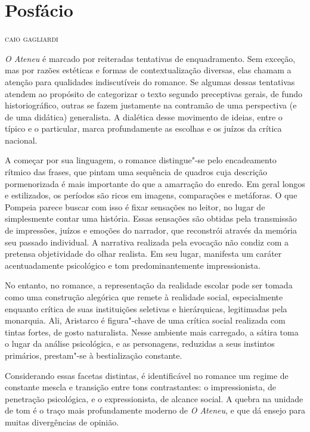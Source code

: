 \chapter[Posfácio]{Posfácio }


\begin{flushright}
\textsc{caio gagliardi}
\end{flushright}

\textit{O Ateneu} é marcado por reiteradas
tentativas de enquadramento. Sem exceção, mas por razões estéticas e
formas de contextualização diversas, elas chamam a atenção para
qualidades indiscutíveis do romance. Se algumas dessas tentativas
atendem ao propósito de categorizar o texto segundo preceptivas gerais,
de fundo historiográfico, outras se fazem justamente na contramão de
uma perspectiva (e de uma didática) generalista. A dialética desse
movimento de ideias, entre o típico e o particular, marca profundamente
as escolhas e os juízos da crítica nacional. 

A começar por sua linguagem, o romance distingue"-se pelo encadeamento
rítmico das frases, que pintam uma sequência de quadros cuja descrição
pormenorizada é mais importante do que a amarração do enredo. Em geral
longos e estilizados, os períodos são ricos em imagens, comparações e
metáforas. O que Pompeia parece buscar com isso é fixar sensações no
leitor, no lugar de simplesmente contar uma história. Essas sensações
são obtidas pela transmissão de impressões, juízos e emoções do
narrador, que reconstrói através da memória seu passado individual. A
narrativa realizada pela evocação não condiz com a pretensa
objetividade do olhar realista. Em seu lugar, manifesta um caráter
acentuadamente psicológico e tom predominantemente impressionista.

No entanto, no romance, a representação da realidade escolar pode ser
tomada como uma construção alegórica que remete à realidade social,
especialmente enquanto crítica de suas instituições seletivas e
hierárquicas, legitimadas pela monarquia. Ali, Aristarco é
figura"-chave de uma crítica social realizada com tintas fortes, de
gosto naturalista. Nesse ambiente mais carregado, a sátira toma o lugar
da análise psicológica, e as personagens, reduzidas a seus instintos
primários, prestam"-se à bestialização constante.

Considerando essas facetas distintas, é identificável no
romance um regime de constante mescla e transição entre tons
contrastantes: o impressionista, de penetração psicológica, e o
expressionista, de alcance social. A quebra na unidade de tom é o traço
mais profundamente moderno de \textit{O Ateneu}, 
e que dá ensejo para muitas divergências de opinião.  

